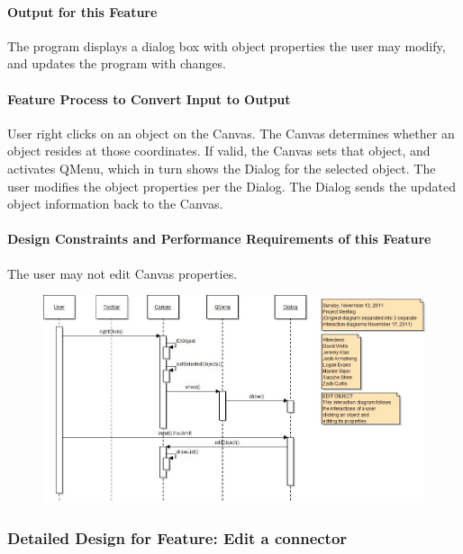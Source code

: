 \documentclass[twoside,letterpaper]{article}
\begin{document}
{\paragraph{Output for this Feature}
{\color{black}
The program displays a dialog box with object properties the user may modify, and updates the program with changes.
}

\paragraph{Feature Process to Convert Input to Output}
{\color{black}
User right clicks on an object on the Canvas. The Canvas determines whether an object resides at those coordinates. If valid, the Canvas sets that object, and activates QMenu, which in turn shows the Dialog for the selected object.
The user modifies the object properties per the Dialog.  The Dialog sends the updated object information back to the Canvas.
}

\paragraph{Design Constraints and Performance Requirements of this Feature}
{\color{black}
The user may not edit Canvas properties.
}
\bigskip
\bigskip

\begin{figure}[h]
\centering
\includegraphics[width=6.0in]{IntEditObj.jpg}
\end{figure}

\clearpage


\subsubsection{Detailed Design for Feature: Edit a connector}

}
\end{document}

